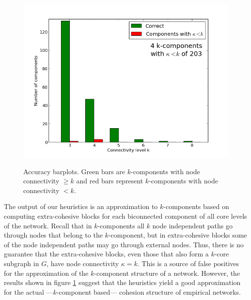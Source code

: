 \begin{figure}[p]
{\includegraphics[scale=0.34]{figures/accuracy_nucl_th_2mode}
}
\hspace{.05in}
\caption[Accuracy barplots for the heuristics.]{Accuracy barplots. Green bars are $k$-components with node connectivity $\ge k$ and red bars represent $k$-components with node connectivity $< k$.}
\label{fig:accuracy}
\end{figure}

The output of our heuristics is an approximation to $k$-components based on computing extra-cohesive blocks for each biconnected component of all core levels of the network. Recall that in $k$-components all $k$ node independent paths go through nodes that belong to the $k$-component, but in extra-cohesive blocks some of the node independent paths may go through external nodes. Thus, there is no guarantee that the extra-cohesive blocks, even those that also form a $k$-core subgraph in $G$, have node connectivity $\kappa = k$. This is a source of false positives for the approximation of the $k$-component structure of a network. However, the results shown in figure \ref{fig:accuracy} suggest that the heuristics yield a good approximation for the actual ---$k$-component based--- cohesion structure of empirical networks.

